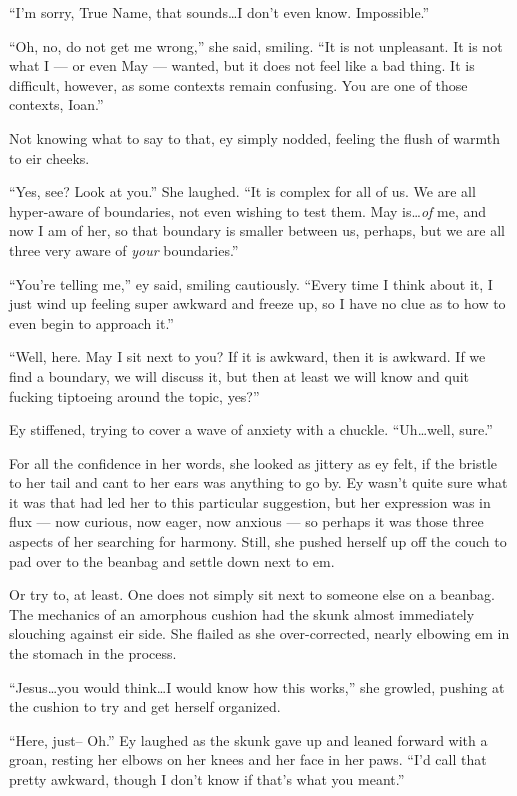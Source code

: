 ``I'm sorry, True Name, that sounds\ldots I don't even know. Impossible.''

``Oh, no, do not get me wrong,'' she said, smiling. ``It is not unpleasant. It is not what I — or even May — wanted, but it does not feel like a bad thing. It is difficult, however, as some contexts remain confusing. You are one of those contexts, Ioan.''

Not knowing what to say to that, ey simply nodded, feeling the flush of warmth to eir cheeks.

``Yes, see? Look at you.'' She laughed. ``It is complex for all of us. We are all hyper-aware of boundaries, not even wishing to test them. May is\ldots{}\emph{of} me, and now I am of her, so that boundary is smaller between us, perhaps, but we are all three very aware of \emph{your} boundaries.''

``You're telling me,'' ey said, smiling cautiously. ``Every time I think about it, I just wind up feeling super awkward and freeze up, so I have no clue as to how to even begin to approach it.''

\protect\hypertarget{cuddle}{}{}``Well, here. May I sit next to you? If it is awkward, then it is awkward. If we find a boundary, we will discuss it, but then at least we will know and quit fucking tiptoeing around the topic, yes?''

Ey stiffened, trying to cover a wave of anxiety with a chuckle. ``Uh\ldots well, sure.''

For all the confidence in her words, she looked as jittery as ey felt, if the bristle to her tail and cant to her ears was anything to go by. Ey wasn't quite sure what it was that had led her to this particular suggestion, but her expression was in flux — now curious, now eager, now anxious — so perhaps it was those three aspects of her searching for harmony. Still, she pushed herself up off the couch to pad over to the beanbag and settle down next to em.

Or try to, at least. One does not simply sit next to someone else on a beanbag. The mechanics of an amorphous cushion had the skunk almost immediately slouching against eir side. She flailed as she over-corrected, nearly elbowing em in the stomach in the process.

``Jesus\ldots you would think\ldots I would know how this works,'' she growled, pushing at the cushion to try and get herself organized.

``Here, just-- Oh.'' Ey laughed as the skunk gave up and leaned forward with a groan, resting her elbows on her knees and her face in her paws. ``I'd call that pretty awkward, though I don't know if that's what you meant.''

